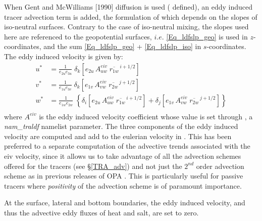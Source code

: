 \documentclass[NEMO_book]{subfiles}
\begin{document}
When Gent and McWilliams [1990] diffusion is used ( defined), 
an eddy induced tracer advection term is added, the formulation of which 
depends on the slopes of iso-neutral surfaces. Contrary to the case of iso-neutral 
mixing, the slopes used here are referenced to the geopotential surfaces, $i.e.$ 
\eqref{Eq_ldfslp_geo} is used in $z$-coordinates, and the sum \eqref{Eq_ldfslp_geo}  
+ \eqref{Eq_ldfslp_iso} in $s$-coordinates. The eddy induced velocity is given by: 
\begin{equation} \label{Eq_ldfeiv}
\begin{split}
 u^* & = \frac{1}{e_{2u}e_{3u}}\; \delta_k \left[e_{2u} \, A_{uw}^{eiv} \; \overline{r_{1w}}^{\,i+1/2} \right]\\
v^* & = \frac{1}{e_{1u}e_{3v}}\; \delta_k \left[e_{1v} \, A_{vw}^{eiv} \; \overline{r_{2w}}^{\,j+1/2} \right]\\
w^* & = \frac{1}{e_{1w}e_{2w}}\; \left\{ \delta_i \left[e_{2u} \, A_{uw}^{eiv} \; \overline{r_{1w}}^{\,i+1/2} \right] + \delta_j \left[e_{1v} \, A_{vw}^{eiv} \; \overline{r_{2w}}^{\,j+1/2} \right] \right\} \\
\end{split}
\end{equation}
where $A^{eiv}$ is the eddy induced velocity coefficient whose value is set 
through , a \textit{nam\_traldf} namelist parameter. 
The three components of the eddy induced velocity are computed and add 
to the eulerian velocity in . This has been preferred to a 
separate computation of the advective trends associated with the eiv velocity, 
since it allows us to take advantage of all the advection schemes offered for 
the tracers (see \S\ref{TRA_adv}) and not just the $2^{nd}$ order advection 
scheme as in previous releases of OPA \citep{Madec1998}. This is particularly 
useful for passive tracers where \emph{positivity} of the advection scheme is 
of paramount importance. 

At the surface, lateral and bottom boundaries, the eddy induced velocity, 
and thus the advective eddy fluxes of heat and salt, are set to zero. 
\end{document}
